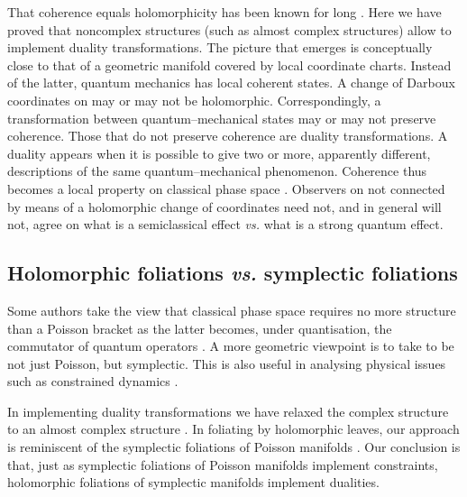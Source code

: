 \documentclass[a4paper,a4paper]{article}
\begin{document}
That coherence equals holomorphicity has been known for long \cite{LONG}.
Here we have proved that noncomplex structures (such as almost 
complex structures) allow to implement duality transformations.
The picture that emerges is conceptually close to that of a 
geometric manifold covered by local coordinate charts. Instead of the 
latter, quantum mechanics has local coherent states. A change of Darboux
coordinates on \coordHE{} may or may not be holomorphic. Correspondingly, 
a transformation between quantum--mechanical states may or may not preserve 
coherence. Those that do not preserve coherence are duality transformations. 
A duality appears when it is possible to give two or more, apparently different, 
descriptions of the same quantum--mechanical phenomenon. Coherence thus becomes 
a local property on classical phase space \coordHE{}. Observers on \coordHE{} not 
connected by means of a holomorphic change of coordinates need not, and in general 
will not, agree on what is a semiclassical effect {\it vs.} what is a strong quantum 
effect. 

\subsection{Holomorphic foliations  {\it vs.} symplectic foliations}
\label{poistruct}

Some authors take the view that classical phase space \coordHE{} requires no more 
structure than a Poisson bracket as the latter becomes, under quantisation, 
the commutator of quantum operators \cite{DIRAC}. A more geometric 
viewpoint \cite{ARNOLD, GQUANT} is to take \coordHE{} to be not just Poisson, 
but symplectic. This is also useful in analysing physical issues such as constrained 
dynamics \cite{JACKIW}. 

In implementing duality transformations we have relaxed the complex structure 
\coordHE{} to an almost complex structure \coordHE{}. In foliating \coordHE{} 
by holomorphic leaves, our approach is reminiscent of the symplectic foliations 
of Poisson manifolds \cite{WEINSTEIN}. Our conclusion is that, just as symplectic 
foliations of Poisson manifolds implement constraints, holomorphic foliations of  
symplectic manifolds implement dualities. 
\end{document}
